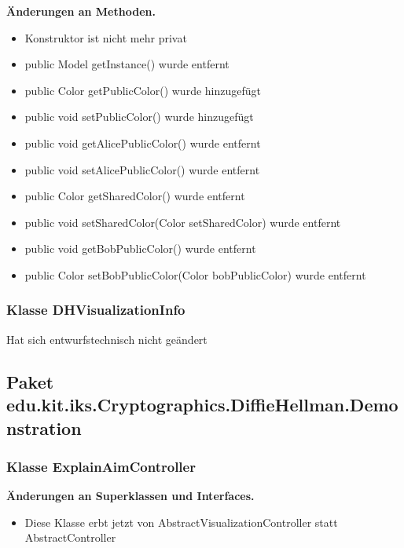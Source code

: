 \documentclass{article}
\begin{document}
    \textbf{Änderungen an Methoden.}\newline
	   \begin{itemize}
           \item Konstruktor ist nicht mehr privat\newline
           \item public Model getInstance() wurde entfernt\newline
           \item public Color getPublicColor() wurde hinzugefügt\newline
           \item public void setPublicColor() wurde hinzugefügt\newline
           \item public void getAlicePublicColor() wurde entfernt\newline
           \item public void setAlicePublicColor() wurde entfernt\newline
           \item public Color getSharedColor() wurde entfernt\newline
           \item public void setSharedColor(Color setSharedColor) wurde entfernt\newline
           \item public void getBobPublicColor() wurde entfernt\newline
           \item public Color setBobPublicColor(Color bobPublicColor) wurde entfernt\newline
           \end{itemize}

	\subsubsection{Klasse DHVisualizationInfo}
    Hat sich entwurfstechnisch nicht geändert

  \subsection{Paket edu.kit.iks.Cryptographics.DiffieHellman.Demonstration}

	\subsubsection{Klasse ExplainAimController}
	    \textbf{Änderungen an Superklassen und Interfaces.}\newline
	   \begin{itemize}
            \item Diese Klasse erbt jetzt von AbstractVisualizationController statt AbstractController\newline
           \end{itemize}
\end{document}
